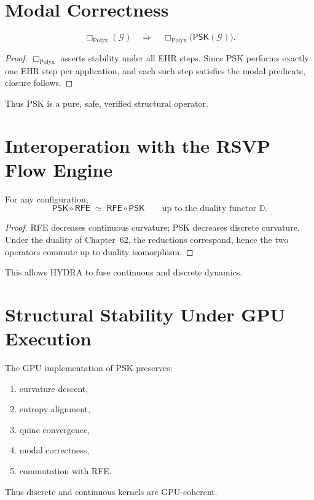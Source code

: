 \section{Modal Correctness}

\begin{theorem}\label{thm:48-modal}
\[
\Box_{\mathrm{Polyx}}(\mathcal{G})
\quad\Longrightarrow\quad
\Box_{\mathrm{Polyx}}\bigl(\mathsf{PSK}(\mathcal{G})\bigr).
\]
\end{theorem}

\begin{proof}
$\Box_{\mathrm{Polyx}}$ asserts stability under all EHR steps.  
Since PSK performs exactly one EHR step per application, and each such step satisfies the modal predicate, closure follows.
\end{proof}

Thus PSK is a pure, safe, verified structural operator.

\section{Interoperation with the RSVP Flow Engine}

\begin{theorem}\label{thm:48-commute}
For any configuration,
\[
\mathsf{PSK}\circ\mathsf{RFE}
\;\simeq\;
\mathsf{RFE}\circ\mathsf{PSK}
\qquad\text{up to the duality functor }\mathbb{D}.
\]
\end{theorem}

\begin{proof}
RFE decreases continuous curvature; PSK decreases discrete curvature.  
Under the duality of Chapter~62, the reductions correspond, hence the two operators commute up to duality isomorphism.
\end{proof}

This allows HYDRA to fuse continuous and discrete dynamics.

\section{Structural Stability Under GPU Execution}

\begin{theorem}\label{thm:48-gpu}
The GPU implementation of PSK preserves:
\begin{enumerate}
    \item curvature descent,
    \item entropy alignment,
    \item quine convergence,
    \item modal correctness,
    \item commutation with RFE.
\end{enumerate}
Thus discrete and continuous kernels are GPU-coherent.
\end{theorem}

